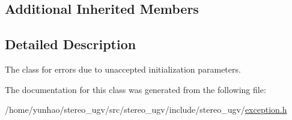 \subsection*{Additional Inherited Members}


\subsection{Detailed Description}
The class for errors due to unaccepted initialization parameters. 

The documentation for this class was generated from the following file\+:\begin{DoxyCompactItemize}
\item 
/home/yunhao/stereo\+\_\+ugv/src/stereo\+\_\+ugv/include/stereo\+\_\+ugv/\hyperlink{exception_8h}{exception.\+h}\end{DoxyCompactItemize}
